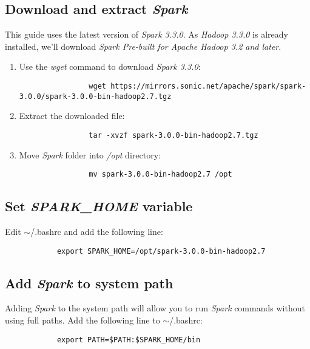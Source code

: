 \documentclass{article}
\begin{document}
        \subsection{Download and extract \emph{Spark}}
        This guide uses the latest version of \emph{Spark 3.3.0}. As \emph{Hadoop 3.3.0} is
        already installed, we'll download \emph{Spark Pre-built for Apache Hadoop 3.2 and later}.
        \begin{enumerate}
            \item Use the \emph{wget} command to download \emph{Spark 3.3.0}:
            \begin{verbatim}
                wget https://mirrors.sonic.net/apache/spark/spark-3.0.0/spark-3.0.0-bin-hadoop2.7.tgz
            \end{verbatim}

            \item Extract the downloaded file:
            \begin{verbatim}
                tar -xvzf spark-3.0.0-bin-hadoop2.7.tgz
            \end{verbatim}

            \item Move \emph{Spark} folder into \emph{/opt} directory:
            \begin{verbatim}
                mv spark-3.0.0-bin-hadoop2.7 /opt
            \end{verbatim}
        \end{enumerate}

        \subsection{Set \emph{SPARK\_HOME} variable}
        Edit $\sim$/.bashrc and add the following line:
        \begin{verbatim}
            export SPARK_HOME=/opt/spark-3.0.0-bin-hadoop2.7
        \end{verbatim}

        \subsection{Add \emph{Spark} to system path}
        Adding \emph{Spark} to the system path will allow you to run \emph{Spark} commands without
        using full paths. Add the following line to $\sim$/.bashrc:
        \begin{verbatim}
            export PATH=$PATH:$SPARK_HOME/bin
        \end{verbatim}
\end{document}
